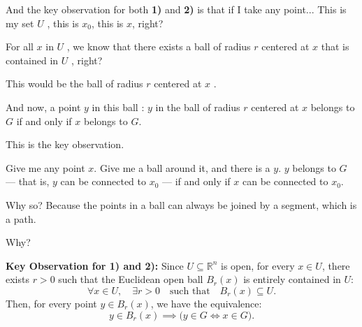 \begin{proofWrapper}
\begin{speech}[01:06:17 - 01:08:17]
And the key observation for both \textbf{1)} and \textbf{2)}  is that if I take any point... This is my set $U$ , this is $x_0$, this is $x$, right?

For all $x$ in $U$ , we know that there exists a ball of radius $r$ centered at $x$ that is contained in $U$ , right?

This would be the ball of radius $r$ centered at $x$ .

And now, a point $y$ in this ball : $y$ in the ball of radius $r$ centered at $x$ belongs to $G$  if and only if $x$ belongs to $G$.

This is the key observation.

Give me any point $x$. Give me a ball around it, and there is a $y$. $y$ belongs to $G$ --- that is, $y$ can be connected to $x_0$ --- if and only if $x$ can be connected to $x_0$.

Why so? Because the points in a ball can always be joined by a segment, which is a path.

Why? 
\end{speech}

\begin{content}
\textbf{Key Observation for 1) and 2):}
Since $U \subseteq \mathbb{R}^n$ is open, for every $x \in U$, there exists $r > 0$ such that the Euclidean open ball $B_r(x)$ is entirely contained in $U$:
\begin{equation}\label{eq:ball-contained-u}
\forall x \in U, \quad \exists r > 0 \quad \text{such that} \quad B_r(x) \subseteq U.
\end{equation}
Then, for every point $y \in B_r(x)$, we have the equivalence:
\begin{equation}\label{eq:key-observation-equiv}
y \in B_r(x) \implies \bigl( y \in G \iff x \in G \bigr).
\end{equation}


\end{content}
\end{proofWrapper}

